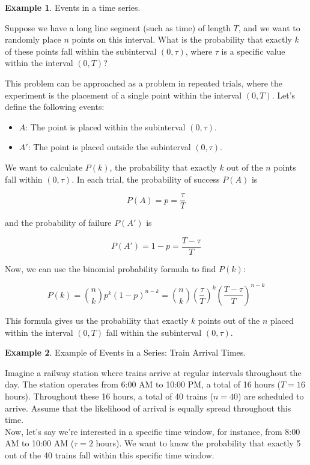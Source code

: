 \documentclass[12pt]{book}
\theoremstyle{definition}
\newtheorem{exmp}{Example}[chapter]
\begin{document}
\begin{tcolorbox}
\begin{exmp}{Events in a time series.}


Suppose we have a long line segment (such as time) of length \(T\), and we want to randomly place \(n\) points on this interval. What is the probability that exactly \(k\) of these points fall within the subinterval \((0, \tau)\), where \(\tau\) is a specific value within the interval \((0, T)\)?\\

\end{exmp}
\end{tcolorbox}

This problem can be approached as a problem in repeated trials, where the experiment is the placement of a single point within the interval \((0, T)\). Let's define the following events:

\begin{itemize}
    \item \(A\): The point is placed within the subinterval \((0, \tau)\).
    \item \(A'\): The point is placed outside the subinterval \((0, \tau)\).
\end{itemize}


We want to calculate \(P(k)\), the probability that exactly \(k\) out of the \(n\) points fall within \((0, \tau)\). In each trial, the probability of success \(P(A)\) is 

\[P(A) = p = \frac{\tau}{T}\]

and the probability of failure \(P(A')\) is 

\[P(A') = 1 - p = \frac{T - \tau}{T}\]

Now, we can use the binomial probability formula to find \(P(k)\):

\[
P(k) = \binom{n}{k} p^k (1 - p)^{n - k} = \binom{n}{k} \left(\frac{\tau}{T}\right)^k \left(\frac{T - \tau}{T}\right)^{n - k}
\]

This formula gives us the probability that exactly \(k\) points out of the \(n\) placed within the interval \((0, T)\) fall within the subinterval \((0, \tau)\).


\begin{tcolorbox}
\begin{exmp}{Example of Events in a Series: Train Arrival Times.}

Imagine a railway station where trains arrive at regular intervals throughout the day. The station operates from 6:00 AM to 10:00 PM, a total of 16 hours (\( T = 16 \) hours). Throughout these 16 hours, a total of 40 trains (\( n = 40 \)) are scheduled to arrive. Assume that the likelihood of arrival is equally spread throughout this time.\\

Now, let's say we're interested in a specific time window, for instance, from 8:00 AM to 10:00 AM (\( \tau = 2 \) hours). We want to know the probability that exactly 5 out of the 40 trains fall within this specific time window.

\end{exmp}
\end{tcolorbox}
\end{document}
